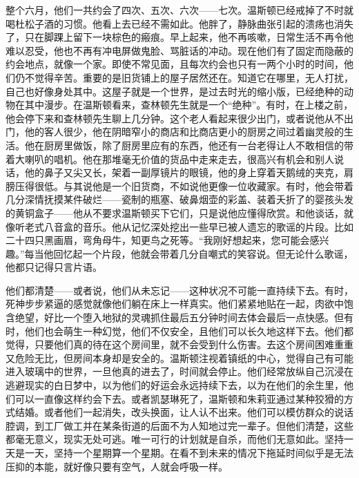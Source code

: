 整个六月，他们一共约会了四次、五次、六次------七次。温斯顿已经戒掉了不时就喝杜松子酒的习惯。他看上去已经不需如此。他胖了，静脉曲张引起的溃疡也消失了，只在脚踝上留下一块棕色的瘢痕。早上起来，他不再咳嗽，日常生活不再令他难以忍受，他也不再有冲电屏做鬼脸、骂脏话的冲动。现在他们有了固定而隐蔽的约会地点，就像一个家。即使不常见面，且每次约会也只有一两个小时的时间，他们仍不觉得辛苦。重要的是旧货铺上的屋子居然还在。知道它在哪里，无人打扰，自己也好像身处其中。这屋子就是一个世界，是过去时光的缩小版，已经绝种的动物在其中漫步。在温斯顿看来，查林顿先生就是一个``绝种''。有时，在上楼之前，他会停下来和查林顿先生聊上几分钟。这个老人看起来很少出门，或者说他从不出门，他的客人很少，他在阴暗窄小的商店和比商店更小的厨房之间过着幽灵般的生活。他在厨房里做饭，除了厨房里应有的东西，他还有一台老得让人不敢相信的带着大喇叭的唱机。他在那堆毫无价值的货品中走来走去，很高兴有机会和别人说话，他的鼻子又尖又长，架着一副厚镜片的眼镜，他的身上穿着天鹅绒的夹克，肩膀压得很低。与其说他是一个旧货商，不如说他更像一位收藏家。有时，他会带着几分深情抚摸某件破烂------瓷制的瓶塞、破鼻烟壶的彩盖、装着夭折了的婴孩头发的黄铜盒子------他从不要求温斯顿买下它们，只是说他应懂得欣赏。和他谈话，就像听老式八音盒的音乐。他从记忆深处挖出一些早已被人遗忘的歌谣的片段。比如二十四只黑画眉，弯角母牛，知更鸟之死等。``我刚好想起来，您可能会感兴趣。''每当他回忆起一个片段，他就会带着几分自嘲式的笑容说。但无论什么歌谣，他都只记得只言片语。

他们都清楚------或者说，他们从未忘记------这种状况不可能一直持续下去。有时，死神步步紧逼的感觉就像他们躺在床上一样真实。他们紧紧地贴在一起，肉欲中饱含绝望，好比一个堕入地狱的灵魂抓住最后五分钟时间去体会最后一点快感。但有时，他们也会萌生一种幻觉，他们不仅安全，且他们可以长久地这样下去。他们都觉得，只要他们真的待在这个房间里，就不会受到什么伤害。去这个房间困难重重又危险无比，但房间本身却是安全的。温斯顿注视着镇纸的中心，觉得自己有可能进入玻璃中的世界，一旦他真的进去了，时间就会停止。他们经常放纵自己沉浸在逃避现实的白日梦中，以为他们的好运会永远持续下去，以为在他们的余生里，他们可以一直像这样约会下去。或者凯瑟琳死了，温斯顿和朱莉亚通过某种狡猾的方式结婚。或者他们一起消失，改头换面，让人认不出来。他们可以模仿群众的说话腔调，到工厂做工并在某条街道的后面不为人知地过完一辈子。但他们清楚，这些都毫无意义，现实无处可逃。唯一可行的计划就是自杀，而他们无意如此。坚持一天是一天，坚持一个星期算一个星期。在看不到未来的情况下拖延时间似乎是无法压抑的本能，就好像只要有空气，人就会呼吸一样。

